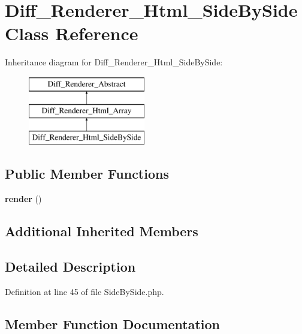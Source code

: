 \section{Diff\+\_\+\+Renderer\+\_\+\+Html\+\_\+\+Side\+By\+Side Class Reference}
\label{class_diff___renderer___html___side_by_side}
Inheritance diagram for Diff\+\_\+\+Renderer\+\_\+\+Html\+\_\+\+Side\+By\+Side\+:\begin{figure}[H]
\begin{center}
\leavevmode
\includegraphics[height=3.000000cm]{class_diff___renderer___html___side_by_side}
\end{center}
\end{figure}
\subsection*{Public Member Functions}
\begin{DoxyCompactItemize}
\item 
{\bf render} ()
\end{DoxyCompactItemize}
\subsection*{Additional Inherited Members}


\subsection{Detailed Description}


Definition at line 45 of file Side\+By\+Side.\+php.



\subsection{Member Function Documentation}
